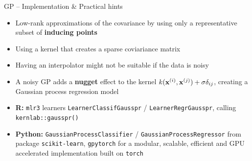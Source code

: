 \begin{frame}{GP -- Implementation \& Practical hints}

\begin{itemize}
	\item Low-rank approximations of the covariance by using only a representative subset of \textbf{inducing points}
	\item Using a kernel that creates a sparse coviariance matrix
\end{itemize}

\medskip

\begin{itemize}
    \item Having an interpolator might not be suitable if the data is noisy
    \item A noisy GP adds a \textbf{nugget} effect to the kernel $k(\mathbf{x}^{(i)}, \mathbf{x}^{(j)}) + \sigma\delta_{ij}$, creating a Gaussian process regression model
\end{itemize}

\medskip


\begin{itemize}
  \item \textbf{R:} \texttt{mlr3} learners \texttt{LearnerClassifGausspr} /
    \texttt{LearnerRegrGausspr}, calling \texttt{kernlab::gausspr()}
  \item \textbf{Python:} \texttt{GaussianProcessClassifier} /
  \texttt{GaussianProcessRegressor} from package \texttt{scikit-learn}, \texttt{gpytorch} for a modular, scalable, efficient and GPU accelerated implementation built on \texttt{torch}
\end{itemize}
\end{frame}

